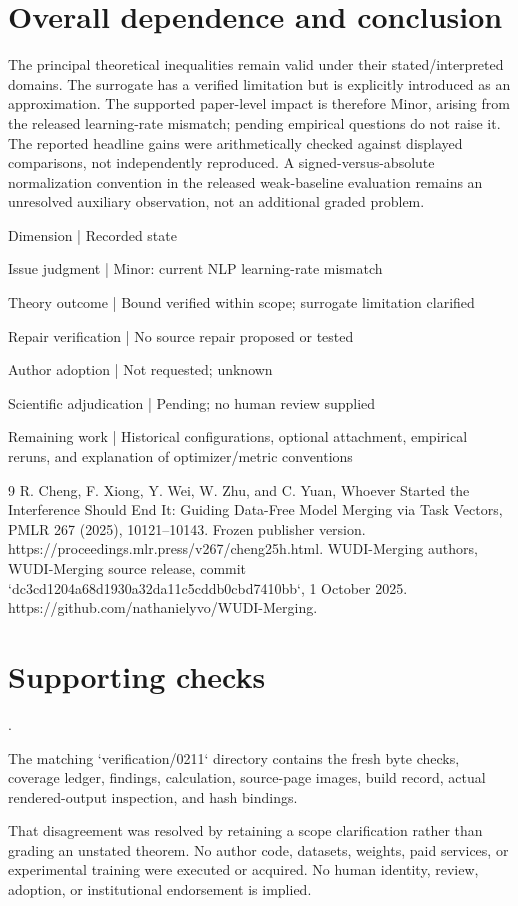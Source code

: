 \documentclass[10pt]{article}
\begin{document}
\section*{Overall dependence and conclusion}
The principal theoretical inequalities remain valid under their stated/interpreted domains. The surrogate has a verified limitation but is explicitly introduced as an approximation. The supported paper-level impact is therefore Minor, arising from the released learning-rate mismatch; pending empirical questions do not raise it. The reported headline gains were arithmetically checked against displayed comparisons, not independently reproduced. A signed-versus-absolute normalization convention in the released weak-baseline evaluation remains an unresolved auxiliary observation, not an additional graded problem.\par
Dimension | Recorded state\par
Issue judgment | Minor: current NLP learning-rate mismatch\par
Theory outcome | Bound verified within scope; surrogate limitation clarified\par
Repair verification | No source repair proposed or tested\par
Author adoption | Not requested; unknown\par
Scientific adjudication | Pending; no human review supplied\par
Remaining work | Historical configurations, optional attachment, empirical reruns, and explanation of optimizer/metric conventions\par
9 R. Cheng, F. Xiong, Y. Wei, W. Zhu, and C. Yuan, Whoever Started the Interference Should End It: Guiding Data-Free Model Merging via Task Vectors, PMLR 267 (2025), 10121–10143. Frozen publisher version. https://proceedings.mlr.press/v267/cheng25h.html. WUDI-Merging authors, WUDI-Merging source release, commit `dc3cd1204a68d1930a32da11c5cddb0cbd7410bb`, 1 October 2025. https://github.com/nathanielyvo/WUDI-Merging.\par
\section*{Supporting checks}
.\par
The matching `verification/0211` directory contains the fresh byte checks, coverage ledger, findings, calculation, source-page images, build record, actual rendered-output inspection, and hash bindings.\par
That disagreement was resolved by retaining a scope clarification rather than grading an unstated theorem. No author code, datasets, weights, paid services, or experimental training were executed or acquired. No human identity, review, adoption, or institutional endorsement is implied.\par
\end{document}

